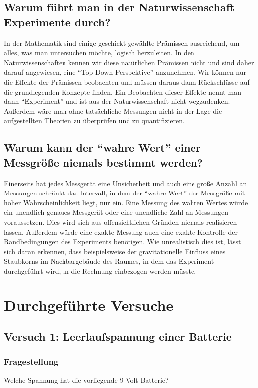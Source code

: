 \documentclass[
	a4paper,
	12pt,
	pagesize,
	ngerman
]{scrartcl}
\begin{document}
	\subsection{Warum führt man in der Naturwissenschaft Experimente durch?}
	In der Mathematik sind einige geschickt gewählte Prämissen ausreichend, um alles, was man untersuchen möchte, logisch herzuleiten. In den Naturwissenschaften kennen wir diese natürlichen Prämissen nicht und sind daher darauf angewiesen, eine \enquote{Top-Down-Perspektive} anzunehmen. Wir können nur die Effekte der Prämissen beobachten und müssen daraus dann Rückschlüsse auf die grundlegenden Konzepte finden. Ein Beobachten dieser Effekte nennt man dann \enquote{Experiment} und ist aus der Naturwissenschaft nicht wegzudenken. Außerdem wäre man ohne tatsächliche Messungen nicht in der Lage die aufgestellten Theorien zu überprüfen und zu quantifizieren.
	
	\subsection{Warum kann der “wahre Wert” einer Messgröße niemals bestimmt werden?}
	Einerseits hat jedes Messgerät eine Unsicherheit und auch eine große Anzahl an Messungen schränkt das Intervall, in dem der \enquote{wahre Wert} der Messgröße mit hoher Wahrscheinlichkeit liegt, nur ein. Eine Messung des wahren Wertes würde ein unendlich genaues Messgerät oder eine unendliche Zahl an Messungen voraussetzen. Dies wird sich aus offensichtlichen Gründen niemals realisieren lassen. Außerdem würde eine exakte Messung auch eine exakte Kontrolle der Randbedingungen des Experiments benötigen. Wie unrealistisch dies ist, lässt sich daran erkennen, dass beispielsweise der gravitationelle Einfluss eines Staubkorns im Nachbargebäude des Raumes, in dem das Experiment durchgeführt wird, in die Rechnung einbezogen werden müsste.
	
	\section{Durchgeführte Versuche}
	\subsection{Versuch 1: Leerlaufspannung einer Batterie}
	
	\subsubsection{Fragestellung}
	Welche Spannung hat die vorliegende 9-Volt-Batterie?
\end{document}
